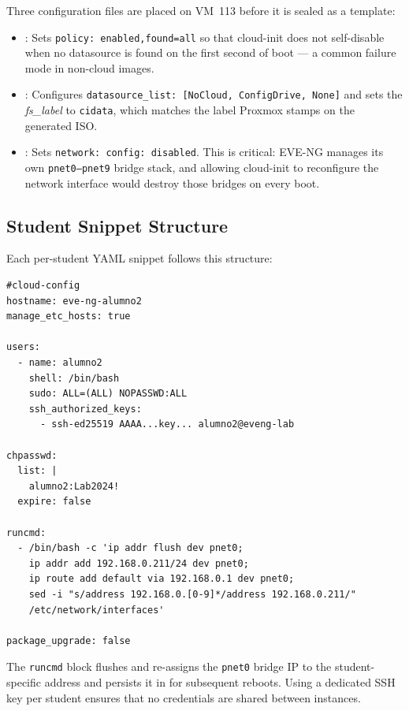 Three configuration files are placed on VM~113 before it is sealed as a template:

\begin{itemize}
    \item \textbf{}: Sets
          \texttt{policy: enabled,found=all} so that cloud-init does not
          self-disable when no datasource is found on the first second of boot ---
          a common failure mode in non-cloud images.
    \item \textbf{}: Configures
          \texttt{datasource\_list: [NoCloud, ConfigDrive, None]} and sets the
          \textit{fs\_label} to \texttt{cidata}, which matches the label Proxmox
          stamps on the generated ISO.
    \item \textbf{}: Sets \texttt{network: config:
          disabled}. This is critical: EVE-NG manages its own \texttt{pnet0--pnet9}
          bridge stack, and allowing cloud-init to reconfigure the network interface
          would destroy those bridges on every boot.
\end{itemize}

\subsection{Student Snippet Structure}

Each per-student YAML snippet follows this structure:

\begin{lstlisting}[caption={Cloud-init user-data snippet for a student VM}, label={lst:cloud-init-yaml}]
#cloud-config
hostname: eve-ng-alumno2
manage_etc_hosts: true

users:
  - name: alumno2
    shell: /bin/bash
    sudo: ALL=(ALL) NOPASSWD:ALL
    ssh_authorized_keys:
      - ssh-ed25519 AAAA...key... alumno2@eveng-lab

chpasswd:
  list: |
    alumno2:Lab2024!
  expire: false

runcmd:
  - /bin/bash -c 'ip addr flush dev pnet0;
    ip addr add 192.168.0.211/24 dev pnet0;
    ip route add default via 192.168.0.1 dev pnet0;
    sed -i "s/address 192.168.0.[0-9]*/address 192.168.0.211/"
    /etc/network/interfaces'

package_upgrade: false
\end{lstlisting}

The \texttt{runcmd} block flushes and re-assigns the \texttt{pnet0} bridge IP
to the student-specific address and persists it in
 for subsequent reboots. Using a dedicated SSH
key per student ensures that no credentials are shared between instances.


